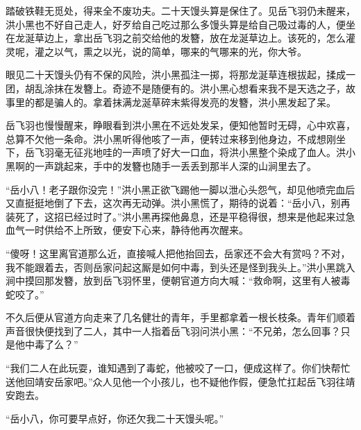 踏破铁鞋无觅处，得来全不废功夫。二十天馒头算是保住了。见岳飞羽仍未醒来，洪小黑也不好自己走人，好歹给自己吃过那么多馒头算是给自己吸过毒的人，便坐在龙涎草边上，拿出岳飞羽之前交给他的发簪，放在龙涎草边上。该死的，怎么灌灵呢，灌之以气，熏之以光，说的简单，哪来的气哪来的光，你大爷。

眼见二十天馒头仍有不保的风险，洪小黑孤注一掷，将那龙涎草连根拔起，揉成一团，胡乱涂抹在发簪上。奇迹不是随便有的。洪小黑心想看来我不是天选之子，故事里的都是骗人的。拿着抹满龙涎草碎末紫得发亮的发簪，洪小黑发起了呆。

岳飞羽也慢慢醒来，睁眼看到洪小黑在不远处发呆，便知他暂时无碍，心中欢喜，总算不欠他一条命。洪小黑听得他咳了一声，便转过来移到他身边，不成想刚坐下，岳飞羽毫无征兆地哇的一声喷了好大一口血，将洪小黑整个染成了血人。洪小黑啊的一声跳起来，手中的发簪也随手一丢丢到那半人深的山涧里去了。

“岳小八！老子跟你没完！”洪小黑正欲飞踢他一脚以泄心头怨气，却见他喷完血后又直挺挺地倒了下去，这次再无动弹。洪小黑慌了，期待的说着：“岳小八，别再装死了，这招已经过时了。”洪小黑再探他鼻息，还是平稳得很，想来是他起来过急血气一时供给不上所致，便安下心来，静待他再次醒来。

“傻呀！这里离官道那么近，直接喊人把他抬回去，岳家还不会大有赏吗？不对，我不能跟着去，否则岳家问起这厮是如何中毒，到头还是怪到我头上。”洪小黑跳入涧中摸回那发簪，放到岳飞羽怀里，便朝官道方向大喊：“救命啊，这里有人被毒蛇咬了。”

不久后便从官道方向走来了几名健壮的青年，手里都拿着一根长枝条。青年们顺着声音很快便找到了二人，其中一人指着岳飞羽问洪小黑：“不兄弟，怎么回事？只是他中毒了么？”

“我们二人在此玩耍，谁知遇到了毒蛇，他被咬了一口，便成这样了。你们快帮忙送他回靖安岳家吧。”众人见他一个小孩儿，也不疑他作假，便急忙扛起岳飞羽往靖安跑去。

“岳小八，你可要早点好，你还欠我二十天馒头呢。”
